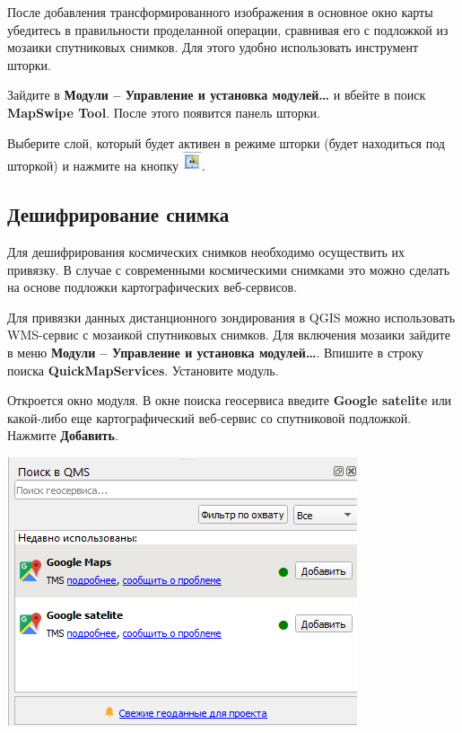 \documentclass[
  12pt,
]{book}
\begin{document}
После добавления трансформированного изображения в основное окно карты убедитесь в правильности проделанной операции, сравнивая его с подложкой из мозаики спутниковых снимков. Для этого удобно использовать инструмент шторки.

Зайдите в \textbf{Модули -- Управление и установка модулей\ldots{}} и вбейте в поиск \textbf{MapSwipe Tool}. После этого появится панель шторки.

Выберите слой, который будет активен в режиме шторки (будет находиться под шторкой) и нажмите на кнопку \includegraphics{images/Practice/Swipe_button.png}.

\subsection{Дешифрирование снимка}\label{practice-georeference-interpretation}

Для дешифрирования космических снимков необходимо осуществить их привязку. В случае с современными космическими снимками это можно сделать на основе подложки картографических веб-сервисов.

Для привязки данных дистанционного зондирования в QGIS можно использовать WMS-сервис с мозаикой спутниковых снимков. Для включения мозаики зайдите в меню \textbf{Модули -- Управление и установка модулей\ldots{}}. Впишите в строку поиска \textbf{QuickMapServices}. Установите модуль.

Откроется окно модуля. В окне поиска геосервиса введите \textbf{Google satelite} или какой-либо еще картографический веб-сервис со спутниковой подложкой. Нажмите \textbf{Добавить}.

\includegraphics{images/practice/QMS.png}
\end{document}
